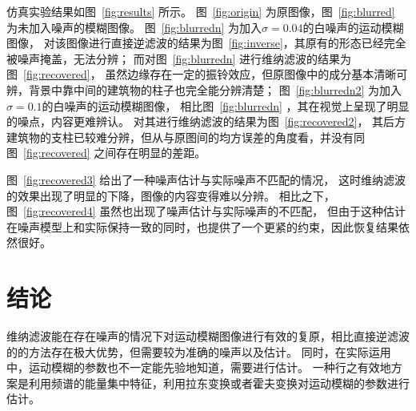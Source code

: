\documentclass{hitgsrep}
\begin{document}
仿真实验结果如图~\ref{fig:results} 所示。
图~\ref{fig:origin} 为原图像，图~\ref{fig:blurred} 为未加入噪声的模糊图像。
图~\ref{fig:blurredn} 为加入$\sigma=0.04$的白噪声的运动模糊图像，
对该图像进行直接逆滤波的结果为图~\ref{fig:inverse}，其原有的形态已经完全被噪声掩盖，无法分辨；
而对图~\ref{fig:blurredn} 进行维纳滤波的结果为图~\ref{fig:recovered}，
虽然边缘存在一定的振铃效应，但原图像中的成分基本清晰可辨，背景中靠中间的建筑物的柱子也完全能分辨清楚；
图~\ref{fig:blurredn2} 为加入$\sigma=0.1$的白噪声的运动模糊图像，
相比图~\ref{fig:blurredn} ，其在视觉上呈现了明显的噪点，内容更难辨认。
对其进行维纳滤波的结果为图~\ref{fig:recovered2}，
其后方建筑物的支柱已较难分辨，但从与原图间的均方误差的角度看，并没有同图~\ref{fig:recovered} 之间存在明显的差距。

图~\ref{fig:recovered3} 给出了一种噪声估计与实际噪声不匹配的情况，
这时维纳滤波的效果出现了明显的下降，图像的内容变得难以分辨。
相比之下，图~\ref{fig:recovered4} 虽然也出现了噪声估计与实际噪声的不匹配，
但由于这种估计在噪声模型上和实际保持一致的同时，也提供了一个更紧的约束，因此恢复结果依然很好。

\section{结论}

维纳滤波能在存在噪声的情况下对运动模糊图像进行有效的复原，相比直接逆滤波的的方法存在极大优势，但需要较为准确的噪声以及估计。
同时，在实际运用中，运动模糊的参数也不一定能先验地知道，需要进行估计。
一种行之有效地方案是利用频谱的能量集中特征，利用拉东变换或者霍夫变换对运动模糊的参数进行估计\cite{_radon_2011}。

\printbibliography[heading=bibliography,title=参考文献]
\end{document}
